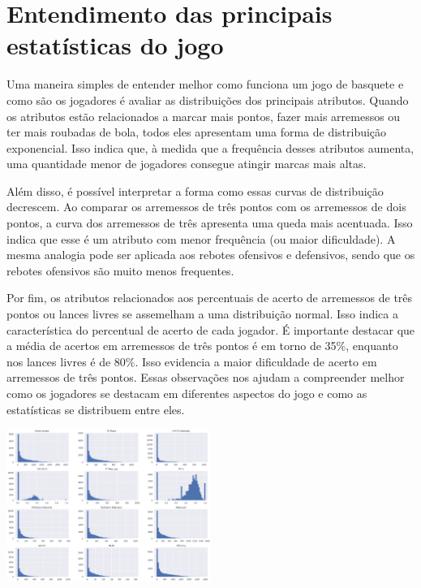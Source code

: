 \documentclass[
]{book}
\begin{document}
\hypertarget{entendimento-das-principais-estatuxedsticas-do-jogo}{%
\chapter{Entendimento das principais estatísticas do jogo}\label{entendimento-das-principais-estatuxedsticas-do-jogo}}

Uma maneira simples de entender melhor como funciona um jogo de basquete e como são os jogadores é avaliar as distribuições dos principais atributos. Quando os atributos estão relacionados a marcar mais pontos, fazer mais arremessos ou ter mais roubadas de bola, todos eles apresentam uma forma de distribuição exponencial. Isso indica que, à medida que a frequência desses atributos aumenta, uma quantidade menor de jogadores consegue atingir marcas mais altas.

Além disso, é possível interpretar a forma como essas curvas de distribuição decrescem. Ao comparar os arremessos de três pontos com os arremessos de dois pontos, a curva dos arremessos de três apresenta uma queda mais acentuada. Isso indica que esse é um atributo com menor frequência (ou maior dificuldade). A mesma analogia pode ser aplicada aos rebotes ofensivos e defensivos, sendo que os rebotes ofensivos são muito menos frequentes.

Por fim, os atributos relacionados aos percentuais de acerto de arremessos de três pontos ou lances livres se assemelham a uma distribuição normal. Isso indica a característica do percentual de acerto de cada jogador. É importante destacar que a média de acertos em arremessos de três pontos é em torno de 35\%, enquanto nos lances livres é de 80\%. Isso evidencia a maior dificuldade de acerto em arremessos de três pontos. Essas observações nos ajudam a compreender melhor como os jogadores se destacam em diferentes aspectos do jogo e como as estatísticas se distribuem entre eles.

\includegraphics[width=0.5\textwidth,height=\textheight]{imagens/15.png}
\end{document}
